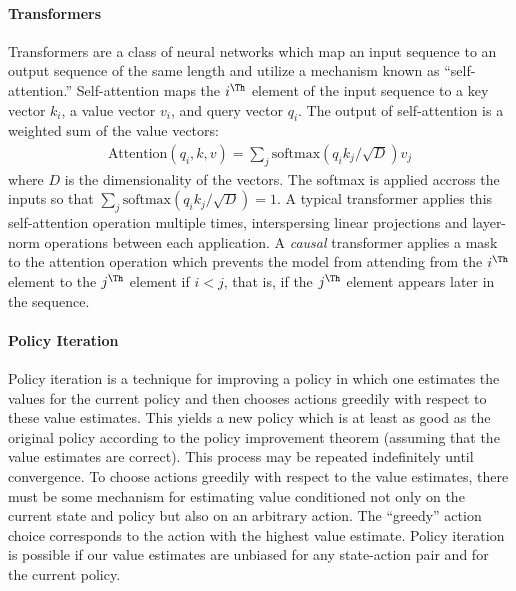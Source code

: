 \paragraph{Transformers} Transformers \parencite{vaswani2017attention} are a class
of neural networks which map an input sequence to an output sequence of the same
length and utilize a mechanism known as ``self-attention.'' Self-attention maps
the $i^\Th$ element of the input sequence to a key vector $k_i$, a value vector
$v_i$, and query vector $q_i$. The output of self-attention is a weighted sum of
the value vectors:
\begin{align}
    \text{Attention}\left(q_i, k, v\right) = \sum_j\text{softmax}\left(q_i k_j/\sqrt{D}\right)v_j
\end{align}
where $D$ is the dimensionality of the vectors. The softmax is applied accross
the inputs so that $\sum_j\text{softmax}\left(q_i k_j/\sqrt{D}\right) = 1$. A
typical transformer applies this self-attention operation multiple times,
interspersing linear projections and layer-norm operations between each
application. A \textit{causal} transformer applies a mask to the attention
operation which prevents the model from attending from the $i^\Th$ element to
the $j^\Th$ element if $i < j$, that is, if the $j^\Th$ element appears later in
the sequence.


\paragraph{Policy Iteration}
Policy iteration is a technique for improving a policy in which one estimates
the values for the current policy and then chooses actions greedily with respect
to these value estimates. This yields a new policy which is at least as good as
the original policy according to the policy improvement theorem (assuming that
the value estimates are correct). This process may be repeated indefinitely
until convergence. To choose actions greedily with respect to the value
estimates, there must be some mechanism for estimating value conditioned not
only on the current state and policy but also on an arbitrary action. The
``greedy'' action choice corresponds to the action with the highest value
estimate. Policy iteration is possible if our value estimates are unbiased for
any state-action pair and for the current policy.

